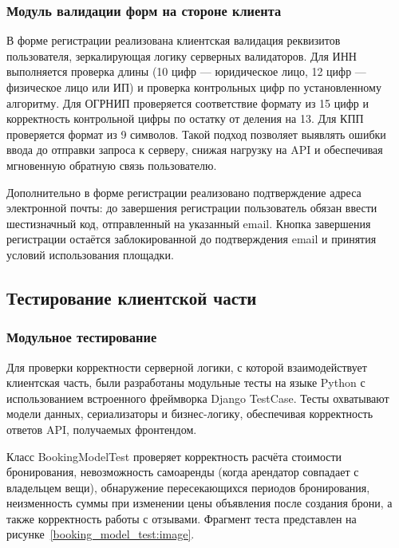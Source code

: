 \subsubsection{Модуль валидации форм на стороне клиента}

В форме регистрации реализована клиентская валидация реквизитов пользователя, зеркалирующая логику серверных валидаторов. Для ИНН выполняется проверка длины (10 цифр — юридическое лицо, 12 цифр — физическое лицо или ИП) и проверка контрольных цифр по установленному алгоритму. Для ОГРНИП проверяется соответствие формату из 15 цифр и корректность контрольной цифры по остатку от деления на 13. Для КПП проверяется формат из 9 символов. Такой подход позволяет выявлять ошибки ввода до отправки запроса к серверу, снижая нагрузку на API и обеспечивая мгновенную обратную связь пользователю.

Дополнительно в форме регистрации реализовано подтверждение адреса электронной почты: до завершения регистрации пользователь обязан ввести шестизначный код, отправленный на указанный email. Кнопка завершения регистрации остаётся заблокированной до подтверждения email и принятия условий использования площадки.

\subsection{Тестирование клиентской части}
\subsubsection{Модульное тестирование}

Для проверки корректности серверной логики, с которой взаимодействует клиентская часть, были разработаны модульные тесты на языке Python с использованием встроенного фреймворка Django TestCase. Тесты охватывают модели данных, сериализаторы и бизнес-логику, обеспечивая корректность ответов API, получаемых фронтендом.

Класс BookingModelTest проверяет корректность расчёта стоимости бронирования, невозможность самоаренды (когда арендатор совпадает с владельцем вещи), обнаружение пересекающихся периодов бронирования, неизменность суммы при изменении цены объявления после создания брони, а также корректность работы с отзывами. Фрагмент теста представлен на рисунке~\ref{booking_model_test:image}.

